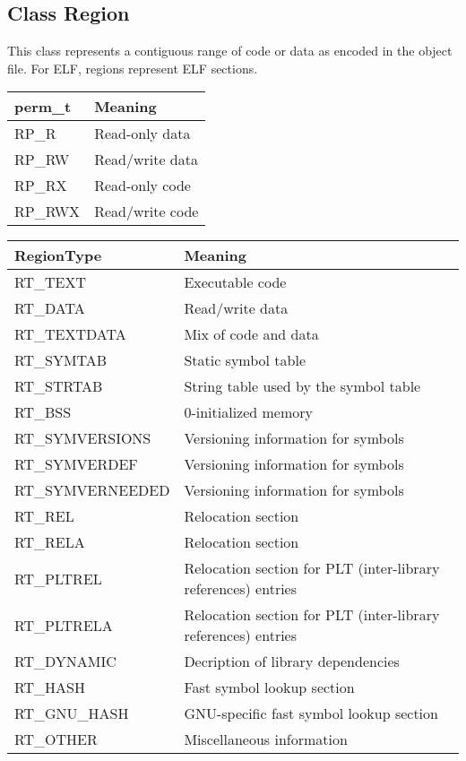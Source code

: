 \subsection{Class Region}

This class represents a contiguous range of code or data as encoded in the object file. For ELF, regions represent ELF sections. 

\begin{center}
\begin{tabular}{ll}
\toprule
perm\_t & Meaning \\
\midrule
RP\_R & Read-only data \\
RP\_RW & Read/write data \\
RP\_RX & Read-only code \\
RP\_RWX & Read/write code \\
\bottomrule
\end{tabular}
\end{center}

\begin{center}
\begin{tabular}{ll}
\toprule
RegionType & Meaning \\
\midrule
RT\_TEXT & Executable code \\
RT\_DATA & Read/write data \\
RT\_TEXTDATA & Mix of code and data \\
RT\_SYMTAB & Static symbol table \\
RT\_STRTAB & String table used by the symbol table \\
RT\_BSS & 0-initialized memory \\
RT\_SYMVERSIONS & Versioning information for symbols \\
RT\_SYMVERDEF & Versioning information for symbols \\
RT\_SYMVERNEEDED & Versioning information for symbols \\
RT\_REL & Relocation section \\
RT\_RELA & Relocation section \\
RT\_PLTREL & Relocation section for PLT (inter-library references) entries \\
RT\_PLTRELA & Relocation section for PLT (inter-library references) entries \\
RT\_DYNAMIC & Decription of library dependencies \\
RT\_HASH & Fast symbol lookup section \\
RT\_GNU\_HASH & GNU-specific fast symbol lookup section \\
RT\_OTHER & Miscellaneous information \\
\bottomrule
\end{tabular}
\end{center}

